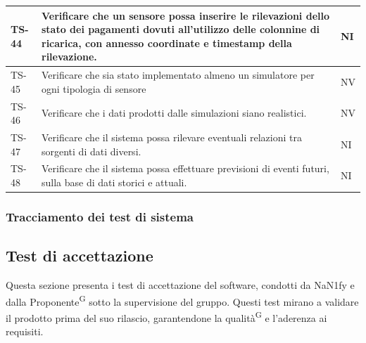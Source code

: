 \documentclass[8pt]{article}
\newcommand{\glossterm}[1]{#1\textsuperscript{G}} %
\begin{document}
\begin{longtable}{|>{\centering}p{2cm}|>{\RaggedRight}m{12cm}|>{\centering\arraybackslash}p{2cm}|}
    \hline
    TS-44 & Verificare che un sensore possa inserire le rilevazioni dello stato dei pagamenti dovuti all'utilizzo delle colonnine di ricarica, con annesso coordinate e timestamp della rilevazione. & NI \\
    \hline
    TS-45 & Verificare che sia stato implementato almeno un simulatore per ogni tipologia di sensore
    & NV \\
    \hline
    TS-46 & Verificare che i dati prodotti dalle simulazioni siano realistici. & NV \\
    \hline
    TS-47 & Verificare che il sistema possa rilevare eventuali relazioni tra sorgenti di dati
    diversi. & NI \\
    \hline
    TS-48 & Verificare che il sistema possa effettuare previsioni di eventi futuri, sulla base di dati storici e attuali. & NI \\
    \hline
\end{longtable}
\subsubsection{Tracciamento dei test di sistema}
\subsection{Test di accettazione}
Questa sezione presenta i test di accettazione del software, condotti da NaN1fy e dalla
\glossterm{Proponente} sotto la supervisione del gruppo. Questi test mirano a validare il prodotto prima del suo rilascio, garantendone la \glossterm{qualità} e l'aderenza ai requisiti.
\end{document}
